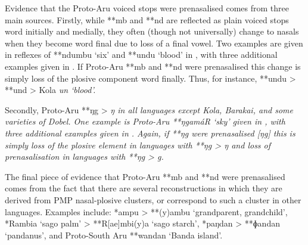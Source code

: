 Evidence that the Proto-Aru voiced stops were prenasalised comes
from three main sources.
Firstly, while **mb and **nd are reflected as plain voiced stops
word initially and medially, they often (though not universally) change to nasals
when they become word final due to loss of a final vowel.
Two examples are given in reflexes of **ndumbu ‘six’
and **undu ‘blood’ in ,
with three additional examples given in .
If Proto-Aru
**mb and **nd were prenasalised this change is simply loss of the
plosive component word finally.
Thus, for instance, **undu > **und > Kola \it{un} ‘blood’.

Secondly, Proto-Aru **ŋg > \it{ŋ} in all languages except Kola,
Barakai, and some varieties of Dobel.
One example is Proto-Aru **ŋgamáR ‘sky’ given in ,
with three additional examples given in .
Again, if **ŋg were prenasalised [ŋg] this is simply loss of the plosive
element in languages with **ŋg > \it{ŋ}
and loss of prenasalisation in languages with **ŋg > \it{g}.

The final piece of evidence that Proto-Aru **mb
and **nd were prenasalised comes from the fact that there are
several reconstructions in which they are derived from PMP nasal-plosive
clusters, or correspond to such a cluster in other languages.
Examples include: *ampu > **(y)ambu ‘grandparent,
grandchild’, *Rambia ‘sago palm’ > **R[ae]mbi(y)a ‘sago starch’,
*paŋdan > **ɸandan ‘pandanus’,
and Proto-South Aru **wandan ‘Banda island’.

